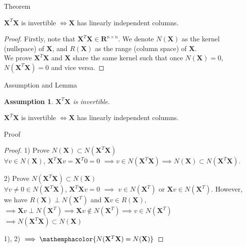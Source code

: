 \documentclass{beamer}
\newtheorem{assumption}{Assumption}
\begin{document}
	\begin{frame}{Theorem}
		\begin{theorem}
			$\mathbf{X}^T\mathbf{X}$ is invertible $\iff \mathbf{X}$ has linearly independent columns.
		\end{theorem}\pause
		\vspace{0.2in}
		\begin{proof}
			Firstly, note that $\mathbf{X}^T\mathbf{X} \in \mathbf{R}^{n \times n}$. We denote $N(\mathbf{X})$ as the kernel (nullspace) of $\mathbf{X}$, and $R(\mathbf{X})$ as the range (column space) of $\mathbf{X}$. \\
			We prove $\mathbf{X}^T\mathbf{X}$ and $\mathbf{X}$ share the same kernel such that once $N(\mathbf{X}) = 0$, $N(\mathbf{X}^T\mathbf{X}) = 0$ and vice versa.
		\end{proof}
	\end{frame}

	\begin{frame}{Assumption and Lemma}
	\begin{assumption}
		$\mathbf{X}^T\mathbf{X}$ is invertible.
	\end{assumption}
	
	\begin{lemma}
		$\mathbf{X}^T\mathbf{X}$ is invertible $\iff \mathbf{X}$ has linearly independent columns.
	\end{lemma}
	
	\end{frame}

	
	\begin{frame}{Proof}
		\begin{proof}
			1) Prove $N(\mathbf{X}) \subset N(\mathbf{X}^T\mathbf{X})$ \\
			$\forall v \in N(\mathbf{X})$, $\mathbf{X}^T\mathbf{X}v = \mathbf{X}^T0 = 0$ $\implies v \in N(\mathbf{X}^T\mathbf{X}) \implies N(\mathbf{X}) \subset N(\mathbf{X}^T\mathbf{X})$. \\ \pause
			
			\vspace{0.2in}
			2) Prove $N(\mathbf{X}^T\mathbf{X}) \subset N(\mathbf{X})$ \\
			$\forall v\neq 0 \in N(\mathbf{X}^T\mathbf{X})$, $\mathbf{X}^T\mathbf{X}v = 0$ $\implies$ $v \in N(\mathbf{X}^T)$ or $\mathbf{X}v \in N(\mathbf{X}^T)$. However, we have $R(\mathbf{X}) \perp N(\mathbf{X}^T)$ and $\mathbf{X}v \in R(\mathbf{X})$, $\implies \mathbf{X}v \perp N(\mathbf{X}^T) \implies \mathbf{X}v \notin N(\mathbf{X}^T) \implies v \in N(\mathbf{X}^T)$
			$\implies N(\mathbf{X}^T\mathbf{X}) \subset N(\mathbf{X})$ \\ \pause
			
			\vspace{0.2in}
			1), 2) $\implies \mathemphacolor{N(\mathbf{X}^T\mathbf{X}) = N(\mathbf{X})}$
		\end{proof}
	\end{frame}
	
\end{document}

